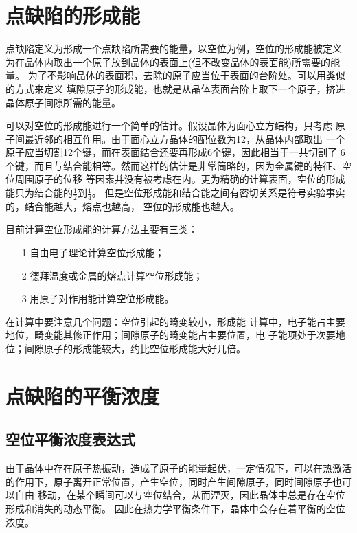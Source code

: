     \section{点缺陷的形成能}
        点缺陷定义为形成一个点缺陷所需要的能量，以空位为例，空位的形成能被定义
        为在晶体内取出一个原子放到晶体的表面上(但不改变晶体的表面能)所需要的能量。
        为了不影响晶体的表面积，去除的原子应当位于表面的台阶处。可以用类似的方式来定义
        填隙原子的形成能，也就是从晶体表面台阶上取下一个原子，挤进晶体原子间隙所需的能量。

        可以对空位的形成能进行一个简单的估计。假设晶体为面心立方结构，只考虑
        原子间最近邻的相互作用。由于面心立方晶体的配位数为12，从晶体内部取出
        一个原子应当切割12个键，而在表面结合还要再形成6个键，因此相当于一共切割了
        6个键，而且与结合能相等。然而这样的估计是非常简略的，因为金属键的特征、空位周围原子的位移
        等因素并没有被考虑在内。更为精确的计算表面，空位的形成能只为结合能的$\frac{1}{2}$到$\frac{1}{4}$。
        但是空位形成能和结合能之间有密切关系是符号实验事实的，结合能越大，熔点也越高，
        空位的形成能也越大。

        目前计算空位形成能的计算方法主要有三类：
        \begin{itemize}
            \item[1] 自由电子理论计算空位形成能；
            \item[2] 德拜温度或金属的熔点计算空位形成能；
            \item[3] 用原子对作用能计算空位形成能。
        \end{itemize}

        在计算中要注意几个问题：空位引起的畸变较小，形成能
        计算中，电子能占主要地位，畸变能其修正作用；间隙原子的畸变能占主要位置，电
        子能项处于次要地位；间隙原子的形成能较大，约比空位形成能大好几倍。
    
    \section{点缺陷的平衡浓度}
        \subsection{空位平衡浓度表达式}
            由于晶体中存在原子热振动，造成了原子的能量起伏，一定情况下，可以在热激活
            的作用下，原子离开正常位置，产生空位，同时产生间隙原子，同时间隙原子也可以自由
            移动，在某个瞬间可以与空位结合，从而湮灭，因此晶体中总是存在空位形成和消失的动态平衡。
            因此在热力学平衡条件下，晶体中会存在着平衡的空位浓度。


